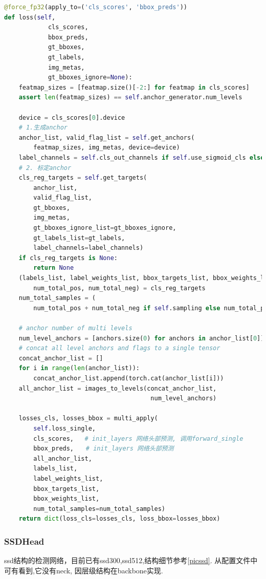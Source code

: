 \documentclass[UTF8]{ctexart}
\begin{document}
\lstset{style=mystyle}
\begin{lstlisting}[language=Python]
@force_fp32(apply_to=('cls_scores', 'bbox_preds'))
def loss(self,
            cls_scores,
            bbox_preds,
            gt_bboxes,
            gt_labels,
            img_metas,
            gt_bboxes_ignore=None):
    featmap_sizes = [featmap.size()[-2:] for featmap in cls_scores]
    assert len(featmap_sizes) == self.anchor_generator.num_levels

    device = cls_scores[0].device
    # 1.生成anchor
    anchor_list, valid_flag_list = self.get_anchors(
        featmap_sizes, img_metas, device=device)
    label_channels = self.cls_out_channels if self.use_sigmoid_cls else 1
    # 2. 标定anchor
    cls_reg_targets = self.get_targets(
        anchor_list,
        valid_flag_list,
        gt_bboxes,
        img_metas,
        gt_bboxes_ignore_list=gt_bboxes_ignore,
        gt_labels_list=gt_labels,
        label_channels=label_channels)
    if cls_reg_targets is None:
        return None
    (labels_list, label_weights_list, bbox_targets_list, bbox_weights_list,
        num_total_pos, num_total_neg) = cls_reg_targets
    num_total_samples = (
        num_total_pos + num_total_neg if self.sampling else num_total_pos)

    # anchor number of multi levels
    num_level_anchors = [anchors.size(0) for anchors in anchor_list[0]]
    # concat all level anchors and flags to a single tensor
    concat_anchor_list = []
    for i in range(len(anchor_list)):
        concat_anchor_list.append(torch.cat(anchor_list[i]))
    all_anchor_list = images_to_levels(concat_anchor_list,
                                        num_level_anchors)

    losses_cls, losses_bbox = multi_apply(
        self.loss_single,
        cls_scores,   # init_layers 网络头部预测, 调用forward_single
        bbox_preds,　　# init_layers 网络头部预测
        all_anchor_list,
        labels_list,
        label_weights_list,
        bbox_targets_list,
        bbox_weights_list,
        num_total_samples=num_total_samples)
    return dict(loss_cls=losses_cls, loss_bbox=losses_bbox)


\end{lstlisting}


\subsubsection{SSDHead}
ssd结构的检测网络，目前已有ssd300,ssd512,结构细节参考\ref{picssd}. 从配置文件中可有看到,它没有neck,
因层级结构在backbone实现.
\end{document}

